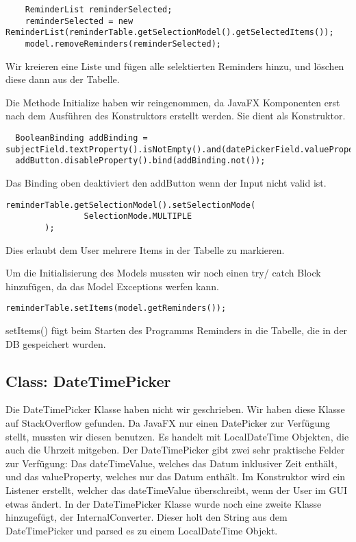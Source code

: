 \begin{lstlisting}
    ReminderList reminderSelected;
    reminderSelected = new ReminderList(reminderTable.getSelectionModel().getSelectedItems());
    model.removeReminders(reminderSelected);
\end{lstlisting}

Wir kreieren eine Liste und fügen alle selektierten Reminders hinzu, und löschen diese dann aus der Tabelle.


Die Methode Initialize haben wir reingenommen, da JavaFX Komponenten erst nach dem Ausführen des Konstruktors erstellt werden. Sie dient als Konstruktor.
\begin{lstlisting}
  BooleanBinding addBinding = subjectField.textProperty().isNotEmpty().and(datePickerField.valueProperty().isNotNull());
  addButton.disableProperty().bind(addBinding.not());
\end{lstlisting}
Das Binding oben deaktiviert den addButton wenn der Input nicht valid ist.

\begin{lstlisting}
reminderTable.getSelectionModel().setSelectionMode(
                SelectionMode.MULTIPLE
        );
\end{lstlisting}
Dies erlaubt dem User mehrere Items in der Tabelle zu markieren.

Um die Initialisierung des Models mussten wir noch einen try/ catch Block hinzufügen, da das Model Exceptions werfen kann.

\begin{lstlisting}
reminderTable.setItems(model.getReminders());
\end{lstlisting}
setItems() fügt beim Starten des Programms Reminders in die Tabelle, die in der DB gespeichert wurden.

\subsection{Class: DateTimePicker}
Die DateTimePicker Klasse haben nicht wir geschrieben. Wir haben diese Klasse auf StackOverflow gefunden. Da JavaFX nur einen DatePicker zur Verfügung stellt, mussten wir
diesen benutzen. Es handelt mit LocalDateTime Objekten, die auch die Uhrzeit mitgeben.
Der DateTimePicker gibt zwei sehr praktische Felder zur Verfügung: Das dateTimeValue, welches das Datum inklusiver Zeit enthält, und das valueProperty, welches nur das Datum enthält.
Im Konstruktor wird ein Listener erstellt, welcher das dateTimeValue überschreibt, wenn der User im GUI etwas ändert.
In der DateTimePicker Klasse wurde noch eine zweite Klasse hinzugefügt, der InternalConverter. Dieser holt den String aus dem DateTimePicker und parsed es zu einem LocalDateTime
Objekt.
